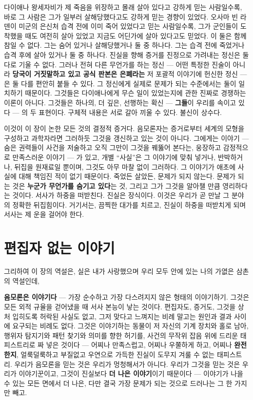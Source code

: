다이애나 왕세자비가 제 죽음을 위장하고 몰래 살아 있다고 강하게 믿는 사람일수록, 바로 그 사람은 그가 일부러 살해당했다고도 강하게 믿는 경향이 있었다. 오사마 빈 라덴이 미군의 은신처 습격 전에 이미 죽어 있었다고 믿는 사람일수록, 그가 군인들이 도착했을 때도 여전히 살아 있었고 지금도 어딘가에 살아 있다고도 믿었다. 이 둘은 함께 참일 수 없다. 그는 숨어 있거나 살해당했거나 둘 중 하나다. 그는 습격 전에 죽었거나 습격 후에 살아 있거나 둘 중 하나다. 진실을 향해 증거를 진정으로 가려내는 정신은 둘 다로 기울 수 없다. 그러나 전혀 다른 무언가를 하는 정신 — 어떤 특정한 진술이 아니라 \textbf{당국이 거짓말하고 있고 공식 판본은 은폐라는} 저 포괄적 이야기에 헌신한 정신 — 은 둘 다를 편안히 붙들 수 있다. 그 정신에게 실제로 문제가 되는 수준에서는 둘이 일치하기 때문이다. 그것들은 다이애나에게 무슨 일이 있었는지에 관한 진짜로 경쟁하는 이론이 아니다. 그것들은 하나의, 더 깊은, 선행하는 확신 — \textbf{그들}이 우리를 속이고 있다 — 의 두 표현이다. 구체적 내용은 서로 갈아 끼울 수 있다. 불신이 상수다.

이것이 이 장이 논한 모든 것의 결정적 증거다. 음모론자는 증거로부터 세계의 모형을 구성하고 과학자라면 그러하듯 그것을 갱신하고 있는 것이 아니다. 그에게는 이야기 — 숨은 권력들이 사건을 저술하고 오직 그만이 그것을 꿰뚫어 본다는, 웅장하고 감정적으로 만족스러운 이야기 — 가 있고, 개별 ``사실''은 그 이야기에 맞춰 넣거나, 반박하거나, 뒤집을 원재료일 뿐이며, 그것도 아무 마찰 없이 그러하다. 그 이야기가 애초에 사실에 대해 책임진 적이 없기 때문이다. 죽었든 살았든, 문제가 되지 않는다. 문제가 되는 것은 \textbf{누군가 무언가를 숨기고 있다}는 것, 그리고 그가 그것을 알아챌 만큼 영리하다는 것이다. 서사가 하중을 떠받친다. 진실은 장식이다. 이것은 우리가 곧 만날 그 분야의 정확한 뒤집힘이다. 거기서는, 끔찍한 대가를 치르고, 진실이 하중을 떠받치게 되며 서사는 제 운을 걸어야 한다.

\section*{편집자 없는 이야기}

그리하여 이 장의 역설은, 실은 내가 사랑했으며 우리 모두 안에 있는 나의 가엾은 삼촌의 역설인데,

\textbf{음모론은 이야기다} — 가장 순수하고 가장 다스려지지 않은 형태의 이야기하기. 그것은 모든 외적 규율을 걷어냈을 때 서사 본능이 낳는 것이다. 편집자도, 증거도, 그것을 상처 입히도록 허락된 사실도 없고, 그저 맞다고 느껴지는 비례 말고는 원인과 결과 사이에 요구되는 비례도 없다. 그것은 이야기하는 동물이 저 자신의 기계 장치와 홀로 남아, 행위자 탐지기와 패턴 찾기와 의미를 향한 허기를, 사건의 무작위 잡음 위에 드리운 태피스트리로 짜 넣은 것이다 — 어찌나 만족스럽고, 어찌나 우쭐하게 하고, 어찌나 \textbf{완전한지}, 얼룩덜룩하고 부질없고 우연으로 가득한 진실이 도무지 겨룰 수 없는 태피스트리. 우리가 음모론을 믿는 것은 우리가 멍청해서가 아니다. 우리가 그것을 믿는 것은 우리가 이야기꾼이고, 그것이 진실보다 \textbf{더 나은 이야기}이기 때문이다 — 이야기가 나을 수 있는 모든 면에서 더 나은, 다만 결국 가장 문제가 되는 것으로 드러나는 그 한 가지만 빼고.

